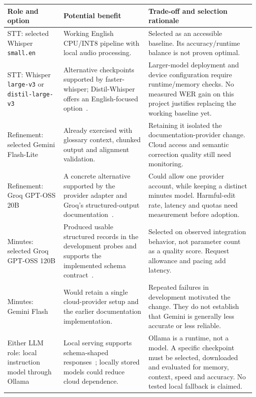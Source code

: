 \documentclass[11pt,a4paper]{article}
\newcommand{\code}[1]{\nolinkurl{#1}}
\begin{document}
\small
\begin{longtable}{@{}>{\raggedright\arraybackslash}p{}>{\raggedright\arraybackslash}p{}>{\raggedright\arraybackslash}p{}@{}}
\toprule Role and option & Potential benefit & Trade-off and selection rationale\\\midrule\endhead
STT: selected Whisper \code{small.en} & Working English CPU/INT8 pipeline with local audio processing. & Selected as an accessible baseline. Its accuracy/runtime balance is not proven optimal.\\[5pt]
STT: Whisper \code{large-v3} or \code{distil-large-v3} & Alternative checkpoints supported by faster-whisper; Distil-Whisper offers an English-focused option~\cite{faster,distil}. & Larger-model deployment and device configuration require runtime/memory checks. No measured WER gain on this project justifies replacing the working baseline yet.\\[5pt]
Refinement: selected Gemini Flash-Lite & Already exercised with glossary context, chunked output and alignment validation. & Retaining it isolated the documentation-provider change. Cloud access and semantic correction quality still need monitoring.\\[5pt]
Refinement: Groq GPT-OSS 20B & A concrete alternative supported by the provider adapter and Groq's structured-output documentation~\cite{groq,gpt20}. & Could allow one provider account, while keeping a distinct minutes model. Harmful-edit rate, latency and quotas need measurement before adoption.\\[5pt]
Minutes: selected Groq GPT-OSS 120B & Produced usable structured records in the development probes and supports the implemented schema contract~\cite{groq}. & Selected on observed integration behavior, not parameter count as a quality score. Request allowance and pacing add latency.\\[5pt]
Minutes: Gemini Flash & Would retain a single cloud-provider setup and the earlier documentation implementation. & Repeated failures in development motivated the change. They do not establish that Gemini is generally less accurate or less reliable.\\[5pt]
Either LLM role: local instruction model through Ollama & Local serving supports schema-shaped responses~\cite{ollama}; locally stored models could reduce cloud dependence. & Ollama is a runtime, not a model. A specific checkpoint must be selected, downloaded and evaluated for memory, context, speed and accuracy. No tested local fallback is claimed.\\
\bottomrule
\end{longtable}
\normalsize
\end{document}
